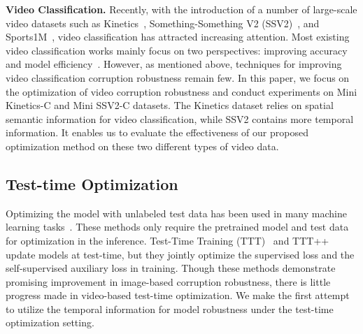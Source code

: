 \documentclass{article} %
\begin{document}
\textbf{Video Classification.} 
Recently, with the introduction of a number of large-scale video datasets such as Kinetics~\citep{carreira2017quo}, Something-Something V2 (SSV2)~\citep{goyal2017something}, and Sports1M~\citep{karpathy2014large}, video classification has attracted increasing attention.
Most existing video classification works mainly focus on two perspectives: improving accuracy~\citep{simonyan2014two,wang2016temporal,carreira2017quo,hara2017learning,xie2018rethinking,ECCV2020ysy,bertasius2021space,li2022mvitv2} and model efficiency~\citep{feichtenhofer2019slowfast,lin2019tsm,feichtenhofer2020x3d,kondratyuk2021movinets,wang2021tdn}.
However, as mentioned above, techniques for improving video classification corruption robustness remain few.
In this paper, we focus on the optimization of video corruption robustness and conduct experiments on Mini Kinetics-C and Mini SSV2-C datasets.
The Kinetics dataset relies on spatial semantic information for video classification, while SSV2 contains more temporal information. 
It enables us to evaluate the effectiveness of our proposed optimization method on these two different types of video data.

\vspace{-0.3cm}
\subsection{Test-time Optimization}

Optimizing the model with unlabeled test data has been used in many machine learning tasks~\citep{shu2022,huang2020neural,shocher2018zero,azimi2022self,niu2022efficient,wang2022continual}. 
These methods only require the pretrained model and test data for optimization in the inference. 
Test-Time Training (TTT)~\citep{sun2020test} and TTT++~\citep{NEURIPS2021_b618c321} update models at test-time, but they jointly optimize the supervised loss and the self-supervised auxiliary loss in training. 
Though these methods demonstrate promising improvement in image-based corruption robustness, there is little progress made in video-based test-time optimization. 
We make the first attempt to utilize the temporal information for model robustness under the test-time optimization setting.  
\vspace{-0.3cm}
\end{document}
